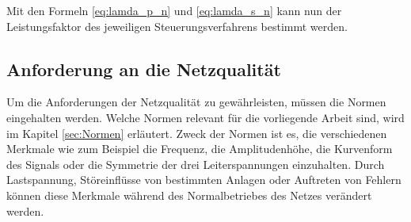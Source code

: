 Mit den Formeln \ref{eq:lamda_p_n} und \ref{eq:lamda_s_n} kann nun der Leistungsfaktor des jeweiligen Steuerungsverfahrens bestimmt werden.   



\subsection{Anforderung an die Netzqualität}


Um die Anforderungen der Netzqualität zu gewährleisten, müssen die Normen eingehalten werden. Welche Normen relevant für die vorliegende Arbeit sind, wird im Kapitel \ref{sec:Normen} erläutert. Zweck der Normen ist es, die verschiedenen Merkmale wie zum Beispiel die Frequenz, die Amplitudenhöhe, die Kurvenform des Signals oder die Symmetrie der drei Leiterspannungen einzuhalten. Durch Lastspannung, Störeinflüsse von bestimmten Anlagen oder Auftreten von Fehlern können diese Merkmale während des Normalbetriebes des Netzes verändert werden. 




